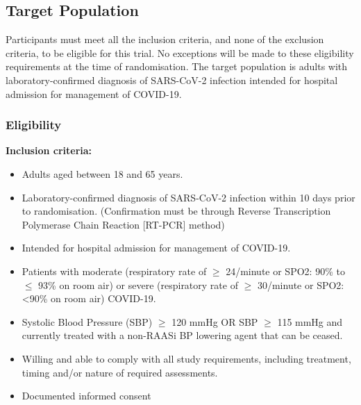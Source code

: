 \documentclass[11pt,parskip=half-]{scrartcl}
\begin{document}
\subsection{Target Population}
Participants must meet all the inclusion criteria, and none of the exclusion criteria, to be eligible for this trial. No exceptions will be made to these eligibility requirements at the time of randomisation. The target population is adults with laboratory-confirmed diagnosis of SARS-CoV-2 infection intended for hospital admission for management of COVID-19.

\subsubsection{Eligibility}
\textbf{Inclusion criteria:}
\begin{itemize}
    \item Adults aged between 18 and 65 years.
    \item Laboratory-confirmed diagnosis of SARS-CoV-2 infection within 10 days prior to randomisation. (Confirmation must be through Reverse Transcription Polymerase Chain Reaction [RT-PCR] method)
    \item Intended for hospital admission for management of COVID-19.
    \item  Patients with moderate (respiratory rate of $\geq$ 24/minute or SPO2: 90\% to $\leq$ 93\% on room air) or severe (respiratory rate of $\geq$ 30/minute or SPO2: <90\% on room air) COVID-19.
    \item  Systolic Blood Pressure (SBP) $\geq$ 120 mmHg OR SBP $\geq$ 115 mmHg and currently treated with a non-RAASi BP lowering agent that can be ceased.
    \item Willing and able to comply with all study requirements, including treatment, timing and/or nature of required assessments.
    \item Documented informed consent
\end{itemize}
\end{document}
